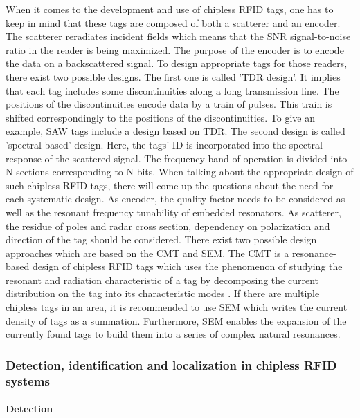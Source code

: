 When it comes to the development and use of chipless RFID tags, one has to keep in mind that these tags are composed of both a scatterer and an encoder. The scatterer reradiates incident fields which means that the \ac{SNR} signal-to-noise ratio in the reader is being maximized. The purpose of the encoder is to encode the data on a backscattered signal. 
To design appropriate tags for those readers, there exist two possible designs. The first one is called '\ac{TDR} design'. It implies that each tag includes some discontinuities along a long transmission line. The positions of the discontinuities encode data by a train of pulses. This train is shifted correspondingly to the positions of the discontinuities. To give an example, \ac{SAW} tags include a design based on TDR. The second design is called 'spectral-based' design. Here, the tags' ID is incorporated into the spectral response of the scattered signal. The frequency band of operation is divided into N sections corresponding to N bits. When talking about the appropriate design of such chipless RFID tags, there will come up the questions about the need for each systematic design. As encoder, the quality factor needs to be considered as well as the resonant frequency tunability of embedded resonators. As scatterer, the residue of poles and radar cross section, dependency on polarization and direction of the tag should be considered. There exist two possible design approaches which are based on the \ac{CMT} and \ac{SEM}. The CMT is a resonance-based design of chipless RFID tags which uses the phenomenon of studying the resonant and radiation characteristic of a tag by decomposing the current distribution on the tag into its characteristic modes \cite[p.81 ff.]{chipless}. If there are multiple chipless tags in an area, it is recommended to use SEM which writes the current density of tags as a summation. Furthermore, SEM enables the expansion of the currently found tags to build them into a series of complex natural resonances.

\subsubsection{Detection, identification and localization in chipless RFID systems}

\paragraph{Detection}


